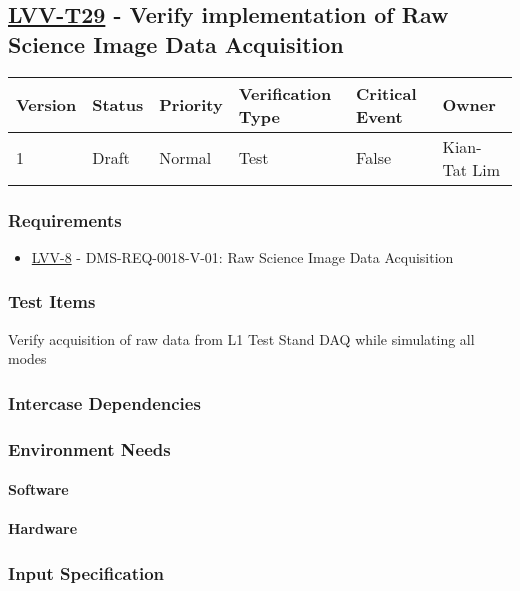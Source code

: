 \subsection{\href{https://jira.lsstcorp.org/secure/Tests.jspa\#/testCase/LVV-T29}{LVV-T29}
    - Verify implementation of Raw Science Image Data Acquisition}\label{lvv-t29}

\begin{longtable}[]{llllll}
\toprule
Version & Status & Priority & Verification Type & Critical Event & Owner
\\\midrule
1 & Draft & Normal &
Test & False & Kian-Tat Lim
\\\bottomrule
\end{longtable}

\subsubsection{Requirements}
\begin{itemize}
\item \href{https://jira.lsstcorp.org/browse/LVV-8}{LVV-8} - DMS-REQ-0018-V-01: Raw Science Image Data Acquisition
\end{itemize}

\subsubsection{Test Items}
Verify acquisition of raw data from L1 Test Stand DAQ while simulating
all modes



\subsubsection{Intercase Dependencies}

\subsubsection{Environment Needs}

\paragraph{Software}

\paragraph{Hardware}

\subsubsection{Input Specification}

